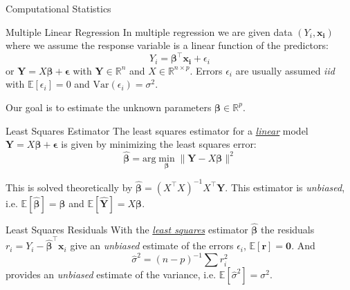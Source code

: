 \documentclass{cognito}
\begin{document}
\lstset{language=Python}
\lstset{mathescape=true}


\begin{note}{Computational Statistics}
\end{note}


\begin{note}{Multiple Linear Regression}
	In multiple regression we are given data $(Y_i, \mathbf{x_i})$ where we assume the response variable is a linear function of the predictors:
	$$ Y_i = \bm{\beta}^\intercal\mathbf{x_i} + \epsilon_i $$
	or $\bm{Y} = X \bm{\beta} + \bm{\epsilon}$ with $\bm{Y} \in \mathds{R}^n$ and $X \in \mathds{R}^{n\times p}$.
	Errors $\epsilon_i$ are usually assumed \emph{iid} with $\mathds{E}[\epsilon_i] = 0$ and $\text{Var}(\epsilon_i) = \sigma^2$.
	\begin{mdframed}[linecolor=black!25!white]
		Our goal is to estimate the unknown parameters $\bm{\beta} \in \mathds{R}^p$.
	\end{mdframed}
	\vspace{-10pt}
\end{note}

\begin{note}{Least Squares Estimator}
	The least squares estimator for a \hyperref[note:Multiple Linear Regression]{\it linear} model $\bm{Y} = X \bm{\beta} + \bm{\epsilon}$ is
	given by minimizing the least squares error:
	$$
		\hat{\bm{\beta}} = \text{arg}\min_{\bm{\beta}} \| \bm{Y} - X\bm{\beta} \|^2
	$$
	\begin{remark} This is solved theoretically by $\hat{\bm{\beta}} = (X^\intercal X)^{-1} X^\intercal \bm{Y}$.
	This estimator is \emph{unbiased}, i.e. $\mathds{E}[\hat{\bm{\beta}}] = \bm{\beta}$ and $\mathds{E}[\hat{\bm{Y}}] =  X\bm{\beta}$.
	\end{remark}
	\vspace{-5pt}
\end{note}

\begin{note}{Least Squares Residuals}
	With the \hyperref[note:Least Squares Estimator]{\it least squares} estimator $\hat{\bm{\beta}}$
	the residuals $r_i = Y_i - \hat{\bm{\beta}}^\intercal \mathbf{x}_i$ give
	an \emph{unbiased} estimate of the errors $\epsilon_i$, $\mathds{E}[\bm{r}] = \bm{0}$.
	And
	$$
		\hat{\sigma}^2 = (n-p)^{-1} \sum r_i^2
	$$
	provides an \emph{unbiased} estimate of the variance, i.e. $\mathds{E}[\hat{\sigma}^2] = \sigma^2$.
\end{note}
\end{document}
